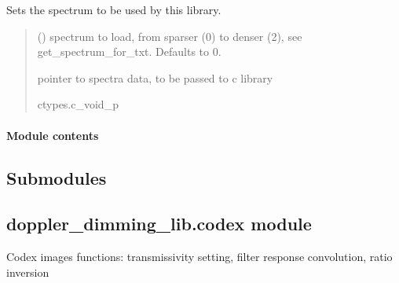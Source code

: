 \documentclass[letterpaper,10pt,english]{sphinxmanual}
\begin{document}
\begin{fulllineitems}
\label{\detokenize{doppler_dimming_lib.spectra:doppler_dimming_lib.spectra.spectra.set_spectrum_level}}
\pysigstartsignatures
{}
\pysigstopsignatures
\sphinxAtStartPar
Sets the spectrum to be used by this library.
\begin{quote}\begin{description}
\sphinxAtStartPar
{} (\sphinxstyleliteralemphasis{\sphinxupquote{, }}) \textendash{} spectrum to load, from sparser (0) to denser (2), see get\_spectrum\_for\_txt. Defaults to 0.

\sphinxAtStartPar
pointer to spectra data, to be passed to c library

\sphinxAtStartPar
ctypes.c\_void\_p

\end{description}\end{quote}

\end{fulllineitems}



\paragraph{Module contents}
\label{\detokenize{doppler_dimming_lib.spectra:module-doppler_dimming_lib.spectra}}\label{\detokenize{doppler_dimming_lib.spectra:module-contents}}

\subsection{Submodules}
\label{\detokenize{doppler_dimming_lib:submodules}}

\subsection{doppler\_dimming\_lib.codex module}
\label{\detokenize{doppler_dimming_lib:module-doppler_dimming_lib.codex}}\label{\detokenize{doppler_dimming_lib:doppler-dimming-lib-codex-module}}
\sphinxAtStartPar
Codex images functions: transmissivity setting, filter response convolution, ratio inversion
\end{document}
